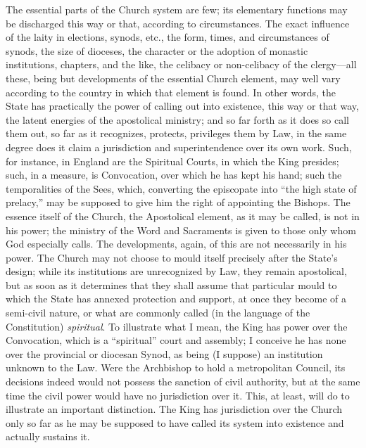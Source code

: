 The essential parts of the
Church system are few; its elementary functions may be discharged this
way or that, according to circumstances. The exact influence of the
laity in elections, synods, etc., the form, times, and circumstances
of synods, the size of dioceses, the character or the adoption of
monastic institutions, chapters, and the like, the celibacy or
non-celibacy of the clergy—all these, being but developments of the
essential Church element, may well vary according to the country in
which that element is found. In other words, the State has practically
the power of calling out into existence, this way or that way, the
latent energies of the apostolical ministry; and so far forth as it
does so call them out, so far as it recognizes, protects, privileges
them by Law, in the same degree does it claim a jurisdiction and
superintendence over its own work. Such, for instance, in England are
the Spiritual Courts, in which the King presides; such, in a measure,
is Convocation, over which he has kept his hand; such the
temporalities of the Sees, which, converting the episcopate into ``the
high state of prelacy,'' may be supposed to give him the right of
appointing the Bishops. The essence itself of the Church, the
Apostolical element, as it may be called, is not in his power; the
ministry of the Word and Sacraments is given to those only whom God
especially calls. The developments, again, of this are not necessarily
in his power. The Church may not choose to mould itself precisely
after the State's design; while its institutions are unrecognized by
Law, they remain apostolical, but as soon as it determines that they
shall assume that particular mould to which the State has annexed
protection and support, at once they become of a semi-civil nature, or
what are commonly called (in the language of the Constitution) \emph{spiritual}.
To illustrate what I mean, the King has power over the Convocation,
which is a ``spiritual'' court and assembly; I conceive he has none over
the provincial or diocesan Synod, as being (I suppose) an institution
unknown to the Law. Were the Archbishop to hold a metropolitan
Council, its decisions indeed would not possess the sanction of civil
authority, but at the same time the civil power would have no
jurisdiction over it. This, at least, will do to illustrate an
important distinction. The King has jurisdiction over the Church only
so far as he may be supposed to have called its system into existence
and actually sustains it.


